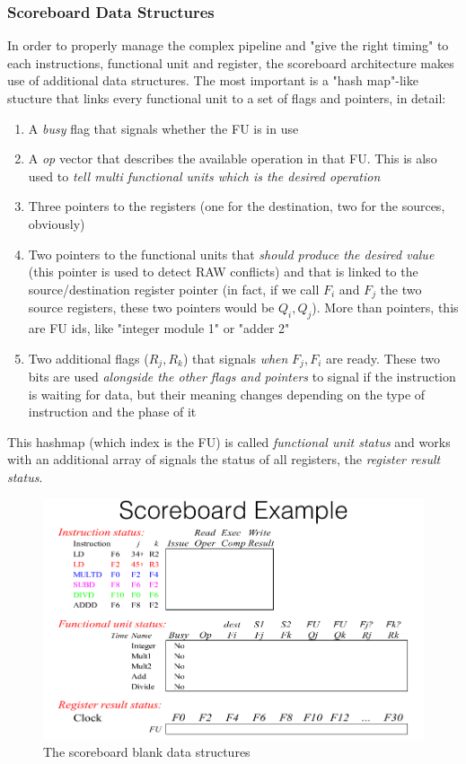 \documentclass[10pt,a4paper]{article}
\begin{document}
				\subsubsection{Scoreboard Data Structures}
 					In order to properly manage the complex pipeline and "give the right timing" to each instructions, functional unit and register, the scoreboard architecture makes use of additional data structures. The most important is a "hash map"-like stucture that links every functional unit to a set of flags and pointers, in detail:
 					\begin{enumerate}
 						\item A \emph{busy} flag that signals whether the FU is in use
 						\item A \emph{op} vector that describes the available operation in that FU. This is also used to \emph{tell multi functional units which is the desired operation}
 						\item Three pointers to the registers (one for the destination, two for the sources, obviously)
 						\item Two pointers to the functional units that \emph{should produce the desired value} (this pointer is used to detect RAW conflicts) and that is linked to the source/destination register pointer (in fact, if we call $F_i$ and $F_j$ the two source registers, these two pointers would be $Q_i, Q_j$). More than pointers, this are FU ids, like "integer module 1" or "adder 2"
 						\item Two additional flags ($R_j, R_k$) that signals \emph{when} $F_j,F_i$ are ready. These two bits are used \emph{alongside the other flags and pointers} to signal if the instruction is waiting for data, but their meaning changes depending on the type of instruction and the phase of it
 					\end{enumerate}
 					This hashmap (which index is the FU) is called \emph{functional unit status} and works with an additional array of signals the status of all registers, the \emph{register result status}.
					\begin{figure}[H]
						\centering
						\includegraphics[width = \textwidth]{./images/Scoreboard1.png}
						\caption{The scoreboard blank data structures}
					\end{figure}
\end{document}
